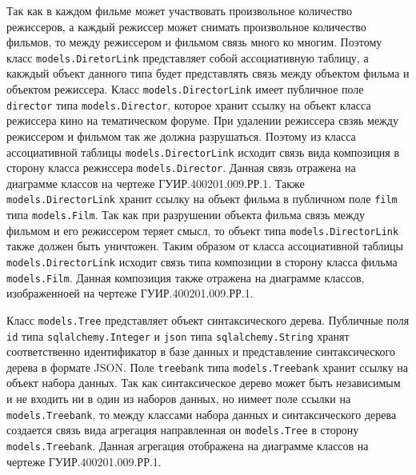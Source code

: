 Так как в каждом фильме может участвовать произвольное количество режиссеров, а каждый режиссер может снимать произвольное количество фильмов, то между режиссером и фильмом связь много ко многим. Поэтому класс \texttt{models.DiretorLink} представляет собой ассоциативную таблицу, а какждый объект данного типа будет представлять связь между объектом фильма и объектом режиссера. Класс \texttt{models.DirectorLink} имеет публичное поле \texttt{director} типа \texttt{models.Director}, которое хранит ссылку на объект класса режиссера кино на тематическом форуме. При удалении режиссера свзяь между режиссером и фильмом так же должна разрушаться. Поэтому из класса ассоциативной таблицы \texttt{models.DirectorLink} исходит связь вида композиция в сторону класса режиссера \texttt{models.Director}. Данная связь отражена на диаграмме классов на чертеже ГУИР.400201.009.РР.1. Также \texttt{models.DirectorLink} хранит ссылку на объект фильма в публичном поле \texttt{film} типа \texttt{models.Film}. Так как при разрушении объекта фильма связь между фильмом и его режиссером теряет смысл, то объект типа \texttt{models.DirectorLink} также должен быть уничтожен. Таким образом от класса ассоциативной таблицы \texttt{models.DirectorLink} исходит связь типа композиции в сторону класса фильма \texttt{models.Film}. Данная композиция также отражена на диаграмме классов, изображенноей на чертеже ГУИР.400201.009.РР.1.

Класс \texttt{models.Tree} представляет объект синтаксического дерева. Публичные поля \texttt{id} типа \texttt{sqlalchemy.Integer} и \texttt{json} типа \texttt{sqlalchemy.String} хранят соответственно идентификатор в базе данных и представление синтаксического дерева в формате JSON\@. Поле \texttt{treebank} типа \texttt{models.Treebank} хранит ссылку на объект набора данных. Так как синтаксическое дерево может быть независимым и не входить ни в один из наборов данных, но иимеет поле ссылки на \texttt{models.Treebank}, то между классами набора данных и синтаксического дерева создается связь вида агрегация направленная он \texttt{models.Tree} в сторону \texttt{models.Treebank}. Данная агрегация отображена на диаграмме классов на чертеже ГУИР.400201.009.РР.1.

